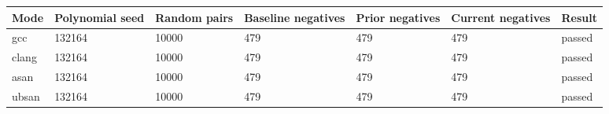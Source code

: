 \begin{tabular}{lllllll}
\hline
Mode & Polynomial seed & Random pairs & Baseline negatives & Prior negatives & Current negatives & Result \\
\hline
gcc & 132164 & 10000 & 479 & 479 & 479 & passed \\
clang & 132164 & 10000 & 479 & 479 & 479 & passed \\
asan & 132164 & 10000 & 479 & 479 & 479 & passed \\
ubsan & 132164 & 10000 & 479 & 479 & 479 & passed \\
\hline
\end{tabular}
